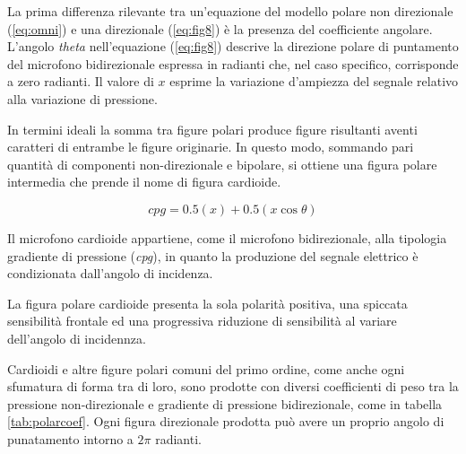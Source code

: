 La prima differenza rilevante tra un'equazione del modello polare non
direzionale (\ref{eq:omni}) e una direzionale (\ref{eq:fig8}) è la
presenza del coefficiente angolare. L'angolo \emph{theta} nell'equazione
(\ref{eq:fig8}) descrive la direzione polare di puntamento del microfono bidirezionale
espressa in radianti che, nel caso specifico, corrisponde a zero radianti. Il valore di
$x$ esprime la variazione d'ampiezza del segnale relativo alla variazione di pressione.

In termini ideali la somma tra figure polari produce figure risultanti aventi caratteri
di entrambe le figure originarie. In questo modo, sommando pari quantità di componenti
non-direzionale e bipolare, si ottiene una figura polare intermedia che prende il
nome di figura cardioide.

\begin{equation}
cpg = 0.5(x) + 0.5(x\cos\theta)
\label{eq:cardioid}
\end{equation}

Il microfono cardioide appartiene, come il microfono bidirezionale, alla tipologia
gradiente di pressione (\emph{cpg}), in quanto la produzione del segnale elettrico è condizionata
dall'angolo di incidenza.

La figura polare cardioide presenta la sola polarità positiva, una spiccata
sensibilità frontale ed una progressiva riduzione di sensibilità al variare dell'angolo
di incidennza.

Cardioidi e altre figure polari comuni del primo ordine, come anche ogni
sfumatura di forma tra di loro, sono prodotte con diversi coefficienti di peso
tra la pressione non-direzionale e gradiente di pressione bidirezionale,
come in tabella \ref{tab:polarcoef}. Ogni figura direzionale prodotta può avere
un proprio angolo di punatamento intorno a $2\pi$ radianti.

\vfill\null

